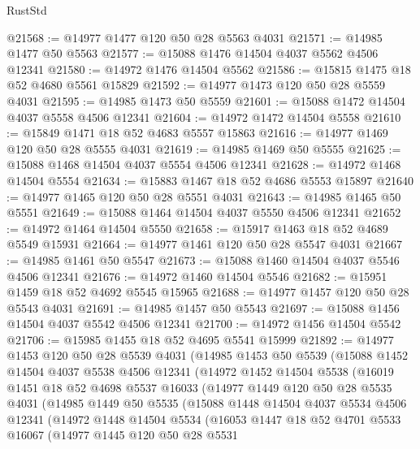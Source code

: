 \begin{lexlean}{RustStd}
\begin{coremodule}
@21568 := @14977 @1477 @120 @50 @28 @5563 @4031
@21571 := @14985 @1477 @50 @5563
@21577 := @15088 @1476 @14504 @4037 @5562 @4506 @12341
@21580 := @14972 @1476 @14504 @5562
@21586 := @15815 @1475 @18 @52 @4680 @5561 @15829
@21592 := @14977 @1473 @120 @50 @28 @5559 @4031
@21595 := @14985 @1473 @50 @5559
@21601 := @15088 @1472 @14504 @4037 @5558 @4506 @12341
@21604 := @14972 @1472 @14504 @5558
@21610 := @15849 @1471 @18 @52 @4683 @5557 @15863
@21616 := @14977 @1469 @120 @50 @28 @5555 @4031
@21619 := @14985 @1469 @50 @5555
@21625 := @15088 @1468 @14504 @4037 @5554 @4506 @12341
@21628 := @14972 @1468 @14504 @5554
@21634 := @15883 @1467 @18 @52 @4686 @5553 @15897
@21640 := @14977 @1465 @120 @50 @28 @5551 @4031
@21643 := @14985 @1465 @50 @5551
@21649 := @15088 @1464 @14504 @4037 @5550 @4506 @12341
@21652 := @14972 @1464 @14504 @5550
@21658 := @15917 @1463 @18 @52 @4689 @5549 @15931
@21664 := @14977 @1461 @120 @50 @28 @5547 @4031
@21667 := @14985 @1461 @50 @5547
@21673 := @15088 @1460 @14504 @4037 @5546 @4506 @12341
@21676 := @14972 @1460 @14504 @5546
@21682 := @15951 @1459 @18 @52 @4692 @5545 @15965
@21688 := @14977 @1457 @120 @50 @28 @5543 @4031
@21691 := @14985 @1457 @50 @5543
@21697 := @15088 @1456 @14504 @4037 @5542 @4506 @12341
@21700 := @14972 @1456 @14504 @5542
@21706 := @15985 @1455 @18 @52 @4695 @5541 @15999
@21892 := @14977
    @1453
    @120
    @50
    @28
    @5539
    @4031
    (@14985
      @1453
      @50
      @5539
      (@15088
        @1452
        @14504
        @4037
        @5538
        @4506
        @12341
        (@14972
          @1452
          @14504
          @5538
          (@16019
            @1451
            @18
            @52
            @4698
            @5537
            @16033
            (@14977
              @1449
              @120
              @50
              @28
              @5535
              @4031
              (@14985
                @1449
                @50
                @5535
                (@15088
                  @1448
                  @14504
                  @4037
                  @5534
                  @4506
                  @12341
                  (@14972
                    @1448
                    @14504
                    @5534
                    (@16053
                      @1447
                      @18
                      @52
                      @4701
                      @5533
                      @16067
                      (@14977
                        @1445
                        @120
                        @50
                        @28
                        @5531

\end{coremodule}
\end{lexlean}
